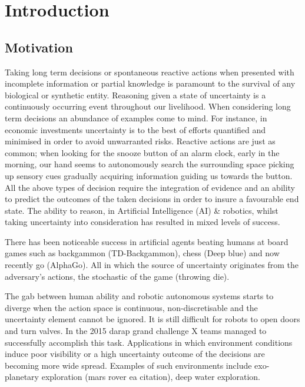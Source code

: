 \chapter{Introduction}

\section{Motivation}


Taking long term decisions or spontaneous reactive actions when presented with incomplete information or partial knowledge is 
paramount to the survival of any biological or synthetic entity. Reasoning given a state of uncertainty is a continuously occurring event throughout our 
livelihood. When considering long term decisions an abundance of examples come to mind. For instance, in economic investments 
uncertainty is to the best of efforts quantified and minimised in order to avoid unwarranted risks. Reactive actions are just as common; 
when looking for the snooze button of an alarm clock, early in the morning, our hand seems to autonomously search the surrounding space picking up
sensory cues gradually acquiring information guiding us towards the button. All the above types of decision require the integration of 
evidence and an ability to predict the outcomes of the taken decisions in order to insure a favourable end state. 
The ability to reason, in Artificial Intelligence (AI) \& robotics, whilst taking uncertainty into consideration has 
resulted in mixed levels of success. 


There has been noticeable success in artificial agents beating humans at board games such as backgammon (TD-Backgammon), chess (Deep blue) and now 
recently go (AlphaGo). All in which the source of uncertainty originates from the adversary's actions, the stochastic of the game (throwing die). 

The gab between human ability and robotic autonomous systems starts to diverge when the action space is continuous, non-discretisable and 
the uncertainty element cannot be ignored. It is still difficult for robots to open doors and turn valves. In the 2015 darap grand 
challenge X teams managed to successfully accomplish this task.
Applications in which environment conditions induce poor visibility or a high uncertainty outcome of the decisions are becoming more 
wide spread. Examples of such environments include exo-planetary exploration (mars rover ea citation), deep water exploration. 


